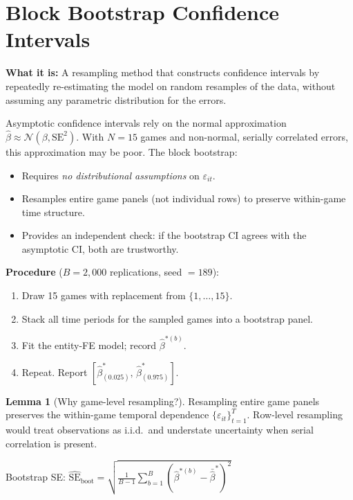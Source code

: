 \documentclass[11pt, letterpaper]{article}
\theoremstyle{definition}
\newtheorem{lemma}[theorem]{Lemma}
\begin{document}
\section{Block Bootstrap Confidence Intervals}

\textbf{What it is:} A resampling method that constructs confidence intervals by repeatedly re-estimating the model on random resamples of the data, without assuming any parametric distribution for the errors.

\begin{whybox}
Asymptotic confidence intervals rely on the normal approximation $\hat{\beta} \approx \mathcal{N}(\beta, \text{SE}^2)$.
With $N = 15$ games and non-normal, serially correlated errors, this approximation may be poor.
The block bootstrap:
\begin{itemize}[nosep]
    \item Requires \emph{no distributional assumptions} on $\varepsilon_{it}$.
    \item Resamples entire game panels (not individual rows) to preserve within-game time structure.
    \item Provides an independent check: if the bootstrap CI agrees with the asymptotic CI, both are trustworthy.
\end{itemize}
\end{whybox}

\begin{mathbox}
\textbf{Procedure} ($B = 2{,}000$ replications, seed $= 189$):
\begin{enumerate}[nosep]
    \item Draw 15 games with replacement from $\{1,\ldots,15\}$.
    \item Stack all time periods for the sampled games into a bootstrap panel.
    \item Fit the entity-FE model; record $\hat{\beta}^{*(b)}$.
    \item Repeat. Report $[\hat{\beta}^{*}_{(0.025)},\, \hat{\beta}^{*}_{(0.975)}]$.
\end{enumerate}

\begin{lemma}[Why game-level resampling?]
Resampling entire game panels preserves the within-game temporal dependence $\{\varepsilon_{it}\}_{t=1}^{T}$.
Row-level resampling would treat observations as i.i.d.\ and understate uncertainty when serial correlation is present.
\end{lemma}

Bootstrap SE: $\displaystyle\widehat{\text{SE}}_{\text{boot}} = \sqrt{\frac{1}{B-1}\sum_{b=1}^{B}\!\left(\hat{\beta}^{*(b)} - \bar{\hat{\beta}}^*\right)^2}$
\end{mathbox}
\end{document}
